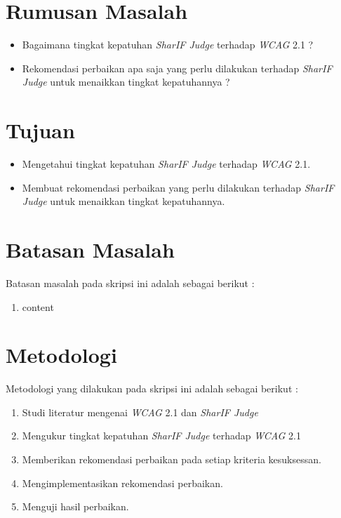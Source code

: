 \section{Rumusan Masalah}
\label{sec:rumusan}
\begin{itemize}
	\item Bagaimana tingkat kepatuhan \textit{SharIF Judge} terhadap \textit{WCAG} 2.1 ?
	\item Rekomendasi perbaikan apa saja yang perlu dilakukan terhadap \textit{SharIF Judge} untuk menaikkan tingkat kepatuhannya ?
\end{itemize}

\section{Tujuan}
\label{sec:tujuan}
\begin{itemize}
	\item Mengetahui tingkat kepatuhan \textit{SharIF Judge} terhadap \textit{WCAG} 2.1.
	\item Membuat rekomendasi perbaikan yang perlu dilakukan terhadap \textit{SharIF Judge} untuk menaikkan tingkat kepatuhannya.
\end{itemize} 

\section{Batasan Masalah}
\label{sec:batasan}
Batasan masalah pada skripsi ini adalah sebagai berikut :

\begin{enumerate}
	\item content
\end{enumerate}

\section{Metodologi}
\label{sec:metlit}
Metodologi yang dilakukan pada skripsi ini adalah sebagai berikut :

\begin{enumerate}
	\item Studi literatur mengenai \textit{WCAG} 2.1 dan \textit{SharIF Judge}
	\item Mengukur tingkat kepatuhan \textit{SharIF Judge} terhadap \textit{WCAG} 2.1
	\item Memberikan rekomendasi perbaikan pada setiap kriteria kesuksessan.
	\item Mengimplementasikan rekomendasi perbaikan.
	\item Menguji hasil perbaikan.
\end{enumerate}

